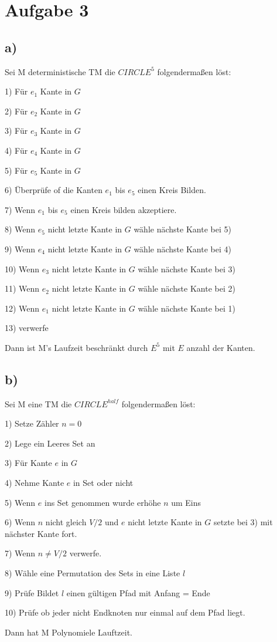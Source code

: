 \section*{Aufgabe 3}

\subsection*{a)}
	Sei M deterministische TM die $CIRCLE^5$ folgendermaßen löst:
	
	1) Für $e_1$ Kante in $G$
	
	2) Für $e_2$ Kante in $G$

	3) Für $e_3$ Kante in $G$

	4) Für $e_4$ Kante in $G$

	5) Für $e_5$ Kante in $G$

	6) Überprüfe of die Kanten $e_1$ bis $e_5$ einen Kreis Bilden.
	
	7) Wenn $e_1$ bis $e_5$  einen Kreis bilden akzeptiere.

	8) Wenn $e_5$ nicht letzte Kante in $G$ wähle nächste Kante bei 5)

	9) Wenn $e_4$ nicht letzte Kante in $G$ wähle nächste Kante bei 4)

	10) Wenn $e_3$ nicht letzte Kante in $G$ wähle nächste Kante bei 3)

	11) Wenn $e_2$ nicht letzte Kante in $G$ wähle nächste Kante bei 2)

	12) Wenn $e_1$ nicht letzte Kante in $G$ wähle nächste Kante bei 1)
	
	13) verwerfe
	
	Dann ist M's Laufzeit beschränkt durch $E^5$ mit $E$ anzahl der Kanten.
	
\subsection*{b)}
	
	Sei M eine TM die $CIRCLE^{half}$ folgendermaßen löst:
	
	1) Setze Zähler $n = 0$
	
	2) Lege ein Leeres Set an
	
	3) Für Kante $e$ in $G$
	
	4) Nehme Kante $e$ in Set oder nicht
	
	5) Wenn $e$ ins Set genommen wurde erhöhe $n$ um Eins
	
	6) Wenn $n$ nicht gleich $V/2$ und $e$ nicht letzte Kante in $G$ setzte bei 3) mit nächster Kante fort. 
	
	7)  Wenn $n \neq V/2$ verwerfe.
	
	8)  Wähle eine Permutation des Sets in eine Liste $l$
	
	9) Prüfe Bildet $l$ einen gültigen Pfad mit Anfang = Ende
	
	10) Prüfe ob jeder nicht Endknoten nur einmal auf dem Pfad liegt.
	
	Dann hat M Polynomiele Lauftzeit.
	